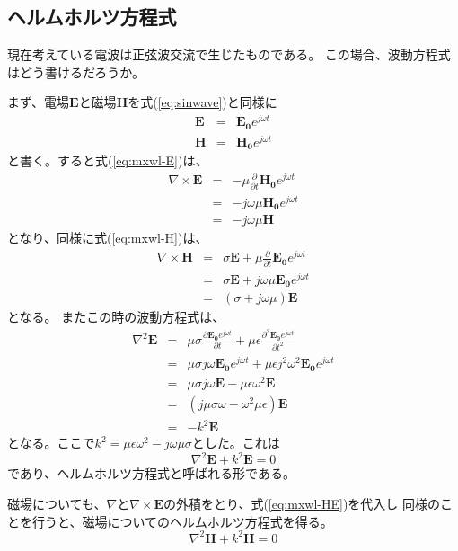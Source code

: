 \subsection*{ヘルムホルツ方程式}
現在考えている電波は正弦波交流で生じたものである。
この場合、波動方程式はどう書けるだろうか。

まず、電場$\bm{E}$と磁場$\bm{H}を$式(\ref{eq:sinwave})と同様に
\begin{eqnarray*}
\bm{E} &=& \bm{E_0}e^{j\omega t}\\
\bm{H} &=& \bm{H_0}e^{j\omega t}
\end{eqnarray*}
と書く。すると式(\ref{eq:mxwl-E})は、
\begin{eqnarray}
\nabla \times \bm{E} &=& -\mu \frac{\partial}{\partial t}\bm{H_0}e^{j\omega t} \nonumber\\
&=& -j\omega\mu\bm{H_0}e^{j\omega t} \nonumber\\
&=& -j\omega \mu \bm{H} \label{eq:mxwl_rotE}
\end{eqnarray}
となり、同様に式(\ref{eq:mxwl-H})は、
\begin{eqnarray}
\nabla \times \bm{H} &=& \sigma \bm{E} + \mu \frac{\partial}{\partial t}\bm{E_0}e^{j\omega t} \nonumber\\
&=& \sigma\bm{E} + j\omega\mu\bm{E_0}e^{j\omega t} \nonumber\\
&=& (\sigma + j\omega \mu) \bm{E} \label{eq:mxwl_rotH}
\end{eqnarray}
となる。
またこの時の波動方程式は、
\begin{eqnarray*}
\nabla^2 \bm{E} &=& \mu \sigma\frac{\partial\bm{E_0}e^{j\omega t}}{\partial t} + \mu\epsilon\frac{\partial^2 \bm{E_0}e^{j\omega t}}{\partial t^2}\\
&=& \mu \sigma j\omega \bm{E_0}e^{j \omega t} + \mu\epsilon j^2 \omega^2 \bm{E_0}e^{j \omega t} \\
&=&\mu \sigma j\omega \bm{E} - \mu\epsilon \omega^2 \bm{E}\\
&=& (j\mu\sigma\omega - \omega^2\mu\epsilon)\bm{E}\\
&=& -k^2\bm{E}
\end{eqnarray*}
となる。ここで$k^2= \mu\epsilon \omega^2 -j\omega\mu\sigma$とした。これは
\begin{equation}
\nabla^2\bm{E} + k^2\bm{E} = 0
\end{equation}
であり、ヘルムホルツ方程式と呼ばれる形である。

磁場についても、$\nabla$と$\nabla\times\bm{E}$の外積をとり、式(\ref{eq:mxwl-HE})を代入し
同様のことを行うと、磁場についてのヘルムホルツ方程式を得る。
\begin{equation}
\nabla^2\bm{H} + k^2\bm{H} = 0
\end{equation}

